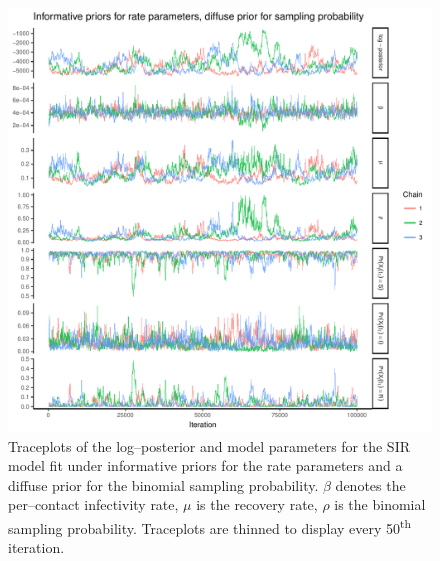 \begin{figure}[htbp]
	\centering
	\includegraphics[width=0.9\linewidth]{figures/informative_diffuse_traceplots.pdf}
	\caption{Traceplots of the log--posterior and model parameters for the SIR model fit under informative priors for the rate parameters and a diffuse prior for the binomial sampling probability. $ \beta $ denotes the per--contact infectivity rate, $ \mu $ is the recovery rate, $ \rho $ is the binomial sampling probability. Traceplots are thinned to display every 50\textsuperscript{th} iteration.}
	\label{fig:inform_diffuse_traces}
\end{figure}


